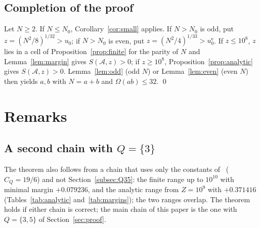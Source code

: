 \documentclass[preprint,11pt]{elsarticle}
\theoremstyle{definition}
\theoremstyle{remark}
\newcommand{\cA}{\mathcal{A}}
\numberwithin{equation}{section}
\begin{document}
\subsection{Completion of the proof}

Let $N\ge2$. If $N\le N_0$, Corollary~\ref{cor:small} applies. If $N>N_0$
is odd, put $z=(N^2/8)^{1/32}>u_0$; if $N>N_0$ is even, put
$z=(N^2/4)^{1/33}>u_0^{\mathrm{e}}$. If $z\le10^8$, $z$ lies in a cell of
Proposition~\ref{prop:finite} for the parity of $N$ and
Lemma~\ref{lem:margin} gives $S(\cA,z)>0$; if $z\ge10^8$,
Proposition~\ref{prop:analytic} gives $S(\cA,z)>0$. Lemma~\ref{lem:odd}
(odd $N$) or Lemma~\ref{lem:even} (even $N$) then yields $a,b$ with
$N=a+b$ and $\Omega(ab)\le32$. \qed

\section{Remarks}\label{sec:remarks}

\subsection{\texorpdfstring{A second chain with $Q=\{3\}$}{A second chain with Q=\{3\}}}
The theorem also follows from a chain that uses only the constants
of~\cite[\S3]{Campbell2026} ($C_Q=19/6$) and not Section~\ref{subsec:Q35}:
the finite range up to $10^{10}$ with minimal margin $+0.079236$, and the
analytic range from $Z=10^9$ with $+0.371416$ (Tables~\ref{tab:analytic}
and~\ref{tab:margins}); the two ranges overlap. The theorem holds if either
chain is correct; the main chain of this paper is the one with $Q=\{3,5\}$
of Section~\ref{sec:proof}.
\end{document}
